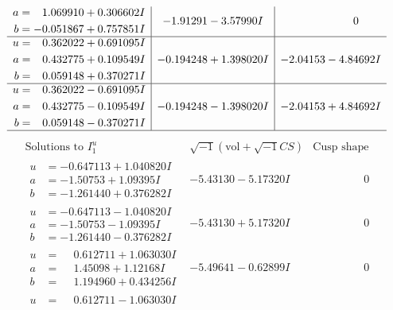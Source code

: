 \documentclass[1p]{elsarticle_modified}
\theoremstyle{definition}
\newcommand{\I}{\sqrt{-1}}
\begin{document}
$$\begin{array}{c|c|c}
\begin{aligned}
a &= \phantom{-}1.069910 + 0.306602 I \\
b &= -0.051867 + 0.757851 I\end{aligned}
 & -1.91291 - 3.57990 I & \phantom{-0.000000 } 0 \\ \hline\begin{aligned}
u &= \phantom{-}0.362022 + 0.691095 I \\
a &= \phantom{-}0.432775 + 0.109549 I \\
b &= \phantom{-}0.059148 + 0.370271 I\end{aligned}
 & -0.194248 + 1.398020 I & -2.04153 - 4.84692 I \\ \hline\begin{aligned}
u &= \phantom{-}0.362022 - 0.691095 I \\
a &= \phantom{-}0.432775 - 0.109549 I \\
b &= \phantom{-}0.059148 - 0.370271 I\end{aligned}
 & -0.194248 - 1.398020 I & -2.04153 + 4.84692 I\\
 \hline 
 \end{array}$$\newpage$$\begin{array}{c|c|c}  
\text{Solutions to }I^u_{1}& \I (\text{vol} + \sqrt{-1}CS) & \text{Cusp shape}\\
 \hline 
\begin{aligned}
u &= -0.647113 + 1.040820 I \\
a &= -1.50753 + 1.09395 I \\
b &= -1.261440 + 0.376282 I\end{aligned}
 & -5.43130 - 5.17320 I & \phantom{-0.000000 } 0 \\ \hline\begin{aligned}
u &= -0.647113 - 1.040820 I \\
a &= -1.50753 - 1.09395 I \\
b &= -1.261440 - 0.376282 I\end{aligned}
 & -5.43130 + 5.17320 I & \phantom{-0.000000 } 0 \\ \hline\begin{aligned}
u &= \phantom{-}0.612711 + 1.063030 I \\
a &= \phantom{-}1.45098 + 1.12168 I \\
b &= \phantom{-}1.194960 + 0.434256 I\end{aligned}
 & -5.49641 - 0.62899 I & \phantom{-0.000000 } 0 \\ \hline\begin{aligned}
u &= \phantom{-}0.612711 - 1.063030 I \\

\end{aligned}
\end{array}$$
\end{document}
